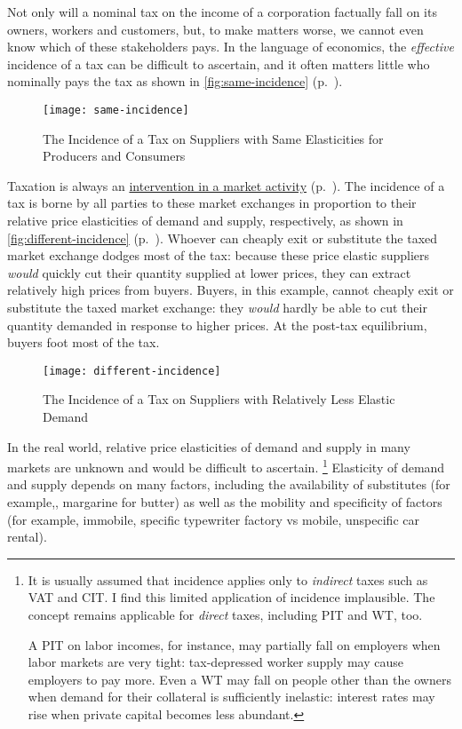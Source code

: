 Not only will a nominal tax on the income of a corporation factually fall on its owners, workers and customers, but, to make matters worse, we cannot even know which of these stakeholders pays.
In the language of economics, the \emph{effective} incidence of a tax can be difficult to ascertain, and it often matters little who nominally pays the tax as shown in \autoref{fig:same-incidence} (p.~\pageref{fig:same-incidence}).

 \begin{figure}[htbp]
	\centering
	\texttt{[image: same-incidence]}
	\caption[Incidence of a Tax on Suppliers with Unit-Elastic Supply and Demand]{The Incidence of a Tax on Suppliers with Same Elasticities for Producers and Consumers}
	\label{fig:same-incidence}
\end{figure}

Taxation is always an \hyperref[sec:market-vs-command]{intervention in a market activity} (p.~\pageref{sec:market-vs-command}).
The incidence of a tax is borne by all parties to these market exchanges in proportion to their relative price elasticities of demand and supply, respectively, as shown in \autoref{fig:different-incidence} (p.~\pageref{fig:different-incidence}).
Whoever can cheaply exit or substitute the taxed market exchange dodges most of the tax:
because these price elastic suppliers \emph{would} quickly cut their quantity supplied at lower prices, they can extract relatively high prices from buyers.
Buyers, in this example, cannot cheaply exit or substitute the taxed market exchange:
they \emph{would} hardly be able to cut their quantity demanded in response to higher prices.
At the post-tax equilibrium, buyers foot most of the tax.

\begin{figure}[htbp]
	\centering
	\texttt{[image: different-incidence]}
	\caption[Incidence of a Tax on Suppliers with Relatively Inelastic Demand]{The Incidence of a Tax on Suppliers with Relatively Less Elastic Demand}
	\label{fig:different-incidence}
\end{figure}

In the real world, relative price elasticities of demand and supply in many markets are unknown and would be difficult to ascertain.
\footnote{
	It is usually assumed that incidence applies only to \emph{indirect} taxes such as \gls{VAT} and \gls{CIT}.
	I find this limited application of incidence implausible.
	The concept remains applicable for \emph{direct} taxes, including \gls{PIT} and \gls{WT}, too.

	A \gls{PIT} on labor incomes, for instance, may partially fall on employers when labor markets are very tight:
	tax-depressed worker supply may cause employers to pay more.
	Even a \gls{WT} may fall on people other than the owners when demand for their collateral is sufficiently inelastic:
	interest rates may rise when private capital becomes less abundant.
}
Elasticity of demand and supply depends on many factors, including the availability of substitutes (for example,, margarine for butter) as well as the mobility and specificity of factors (for example, immobile, specific typewriter factory vs mobile, unspecific car rental).

